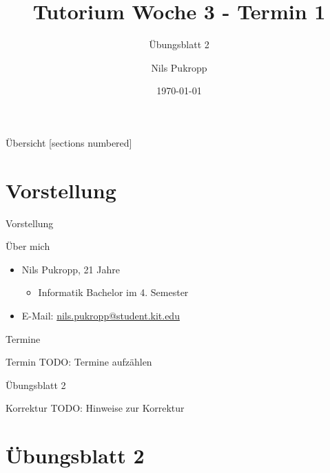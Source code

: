 \documentclass[aspectratio=169]{beamer}
\title{Tutorium Woche 3 - Termin 1}
\subtitle{Übungsblatt 2}
\date{\today}
\author{Nils Pukropp}
\institute{INSTITUT FÜR PROGRAMMSTRUKTUREN UND DATENORGANISATION}
\begin{document}
\maketitle

\begin{frame}{Übersicht}
  [sections numbered]
  \tableofcontents[hideallsubsections]
\end{frame}

\section{Vorstellung}
\begin{frame}[fragile]{Vorstellung}
  \begin{block}{Über mich}
  \begin{itemize}
    \item Nils Pukropp, 21 Jahre
    \begin{itemize}
      \item Informatik Bachelor im 4. Semester
    \end{itemize}
    \item E-Mail: \href{mailto:nils.pukropp@student.kit.edu}{nils.pukropp@student.kit.edu}
  \end{itemize}
\end{block}
\end{frame}

\begin{frame}[fragile]{Termine}
  \begin{alertblock}{Termin}
    TODO: Termine aufzählen
  \end{alertblock}
\end{frame}

\begin{frame}[fragile]{Übungsblatt 2}
  \begin{block}{Korrektur}
    TODO: Hinweise zur Korrektur
  \end{block}

\end{frame}

\section{Übungsblatt 2}
\end{document}
